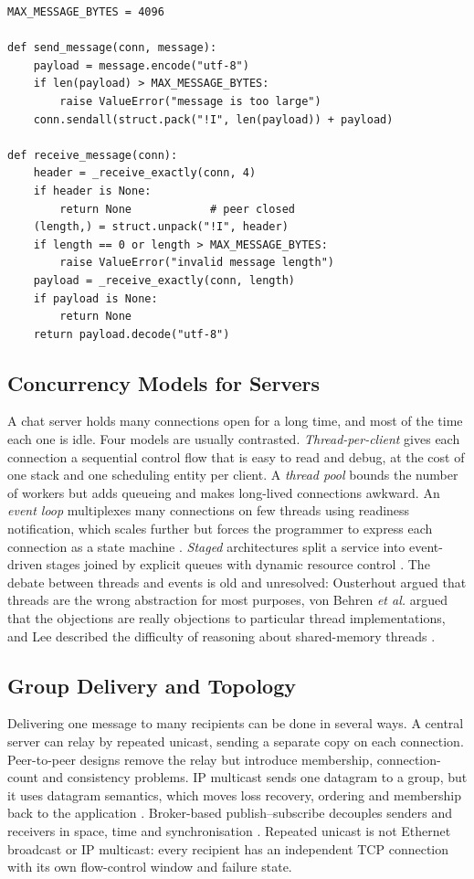 \documentclass[conference]{IEEEtran}
\begin{document}
\begin{lstlisting}[caption={Framing logic of the reference implementation (\texttt{protocol.py}, condensed).},label={lst:frame},float=t]
MAX_MESSAGE_BYTES = 4096

def send_message(conn, message):
    payload = message.encode("utf-8")
    if len(payload) > MAX_MESSAGE_BYTES:
        raise ValueError("message is too large")
    conn.sendall(struct.pack("!I", len(payload)) + payload)

def receive_message(conn):
    header = _receive_exactly(conn, 4)
    if header is None:
        return None            # peer closed
    (length,) = struct.unpack("!I", header)
    if length == 0 or length > MAX_MESSAGE_BYTES:
        raise ValueError("invalid message length")
    payload = _receive_exactly(conn, length)
    if payload is None:
        return None
    return payload.decode("utf-8")
\end{lstlisting}

\subsection{Concurrency Models for Servers}
A chat server holds many connections open for a long time, and most of the time each one is idle. Four models are usually contrasted. \emph{Thread-per-client} gives each connection a sequential control flow that is easy to read and debug, at the cost of one stack and one scheduling entity per client. A \emph{thread pool} bounds the number of workers but adds queueing and makes long-lived connections awkward. An \emph{event loop} multiplexes many connections on few threads using readiness notification, which scales further but forces the programmer to express each connection as a state machine \cite{kegel,krohn}. \emph{Staged} architectures split a service into event-driven stages joined by explicit queues with dynamic resource control \cite{seda}. The debate between threads and events is old and unresolved: Ousterhout argued that threads are the wrong abstraction for most purposes, von Behren \emph{et al.} argued that the objections are really objections to particular thread implementations, and Lee described the difficulty of reasoning about shared-memory threads \cite{ousterhout,vonbehren,lee}.

\subsection{Group Delivery and Topology}
Delivering one message to many recipients can be done in several ways. A central server can relay by repeated unicast, sending a separate copy on each connection. Peer-to-peer designs remove the relay but introduce membership, connection-count and consistency problems. IP multicast sends one datagram to a group, but it uses datagram semantics, which moves loss recovery, ordering and membership back to the application \cite{rfc1112}. Broker-based publish--subscribe decouples senders and receivers in space, time and synchronisation \cite{eugster}. Repeated unicast is not Ethernet broadcast or IP multicast: every recipient has an independent TCP connection with its own flow-control window and failure state.
\end{document}

